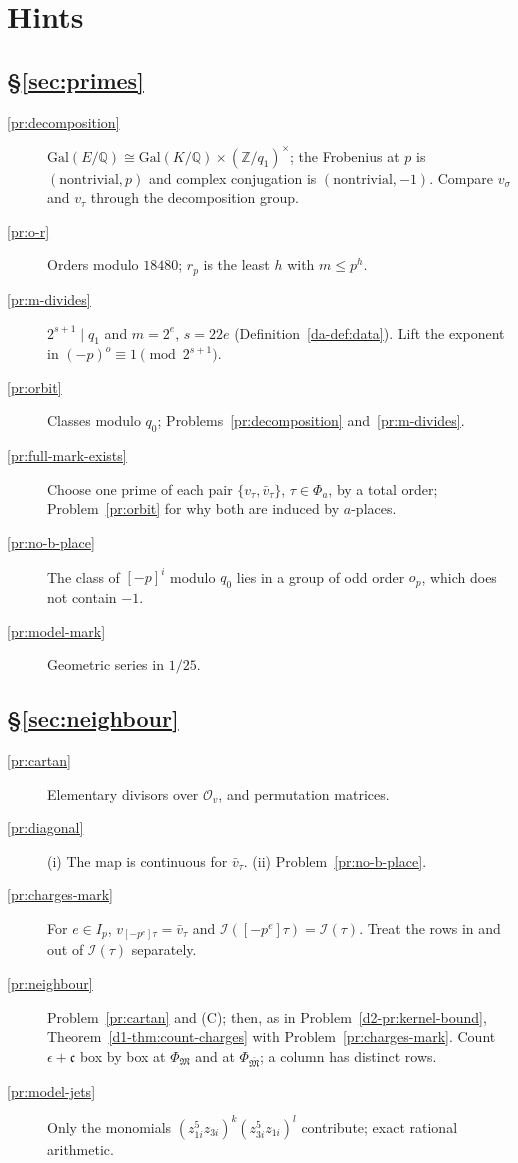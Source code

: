 \documentclass[reqno]{amsart}
\theoremstyle{plain}
\theoremstyle{definition}
\theoremstyle{remark}
\newcommand{\Z}{\mathbb{Z}}
\newcommand{\Oc}{\mathcal O}
\newcommand{\Ic}{\mathcal I}
\newcommand{\Mk}{\mathfrak M}
\newcommand{\Mb}{\bar{\mathfrak M}}
\newcommand{\ch}{\mathfrak c}
\begin{document}
\section*{Hints}

\subsection*{\S\ref{sec:primes}}
\begin{description}
\item[\ref{pr:decomposition}] \(\mathrm{Gal}(E/\mathbb Q) \cong \mathrm{Gal}(K/\mathbb Q) \times (\Z/q_1)^\times\); the Frobenius at \(p\) is \((\text{nontrivial}, p)\) and complex conjugation is \((\text{nontrivial}, -1)\).  Compare \(v_\sigma\) and \(v_\tau\) through the decomposition group.
\item[\ref{pr:o-r}] Orders modulo \(18480\); \(r_p\) is the least \(h\) with \(m \le p^h\).
\item[\ref{pr:m-divides}] \(2^{s+1} \mid q_1\) and \(m = 2^e\), \(s = 22e\) (Definition~\ref{da-def:data}).  Lift the exponent in \((-p)^o \equiv 1 \pmod{2^{s+1}}\).
\item[\ref{pr:orbit}] Classes modulo \(q_0\); Problems~\ref{pr:decomposition} and~\ref{pr:m-divides}.
\item[\ref{pr:full-mark-exists}] Choose one prime of each pair \(\{v_\tau, \bar v_\tau\}\), \(\tau \in \Phi_a\), by a total order; Problem~\ref{pr:orbit} for why both are induced by \(a\)-places.
\item[\ref{pr:no-b-place}] The class of \([-p]^i\) modulo \(q_0\) lies in a group of odd order \(o_p\), which does not contain \(-1\).
\item[\ref{pr:model-mark}] Geometric series in \(1/25\).
\end{description}

\subsection*{\S\ref{sec:neighbour}}
\begin{description}
\item[\ref{pr:cartan}] Elementary divisors over \(\Oc_v\), and permutation matrices.
\item[\ref{pr:diagonal}] (i) The map is continuous for \(\bar v_\tau\).  (ii) Problem~\ref{pr:no-b-place}.
\item[\ref{pr:charges-mark}] For \(e \in I_p\), \(v_{[-p^e]\tau} = \bar v_\tau\) and \(\Ic([-p^e]\tau) = \Ic(\tau)\).  Treat the rows in and out of \(\Ic(\tau)\) separately.
\item[\ref{pr:neighbour}] Problem~\ref{pr:cartan} and (C); then, as in Problem~\ref{d2-pr:kernel-bound}, Theorem~\ref{d1-thm:count-charges} with Problem~\ref{pr:charges-mark}.  Count \(\epsilon + \ch\) box by box at \(\Phi_{\Mk}\) and at \(\Phi_{\Mb}\); a column has distinct rows.
\item[\ref{pr:model-jets}] Only the monomials \((z_{1i}^5z_{3i})^k(z_{3i}^5z_{1i})^l\) contribute; exact rational arithmetic.
\end{description}
\end{document}
